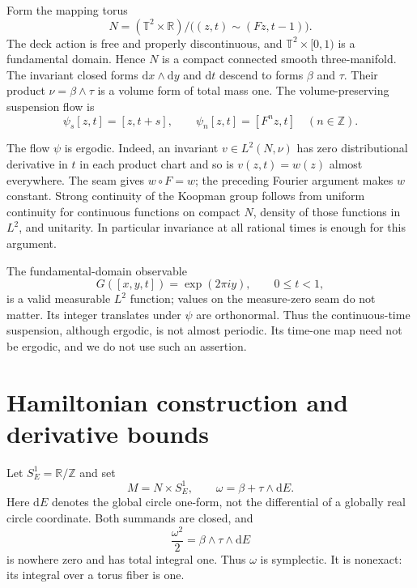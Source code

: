 \documentclass[11pt]{article}
\newcommand{\T}{\mathbb T}
\newcommand{\R}{\mathbb R}
\newcommand{\Z}{\mathbb Z}
\newcommand{\dd}{\mathrm d}
\begin{document}
Form the mapping torus
\[
 N=(\T^2\times\R)/\bigl((z,t)\sim(Fz,t-1)\bigr).
\]
The deck action is free and properly discontinuous, and
$\T^2\times[0,1)$ is a fundamental domain. Hence $N$ is a compact
connected smooth three-manifold. The invariant closed forms
$\dd x\wedge\dd y$ and $\dd t$ descend to forms $\beta$ and $\tau$.
Their product $\nu=\beta\wedge\tau$ is a volume form of total mass one.
The volume-preserving suspension flow is
\[
 \psi_s[z,t]=[z,t+s],\qquad \psi_n[z,t]=[F^n z,t]\quad(n\in\Z).
\]

The flow $\psi$ is ergodic. Indeed, an invariant $v\in L^2(N,\nu)$
has zero distributional derivative in $t$ in each product chart and so is
$v(z,t)=w(z)$ almost everywhere. The seam gives $w\circ F=w$;
the preceding Fourier argument makes $w$ constant. Strong continuity of
the Koopman group follows from uniform continuity for continuous functions
on compact $N$, density of those functions in $L^2$, and unitarity.
In particular invariance at all rational times is enough for this argument.

The fundamental-domain observable
\begin{equation}\label{eq:G}
 G([x,y,t])=\exp(2\pi i y),\qquad 0\le t<1,
\end{equation}
is a valid measurable $L^2$ function; values on the measure-zero seam
do not matter. Its integer translates under $\psi$ are orthonormal.
Thus the continuous-time suspension, although ergodic, is not almost periodic.
Its time-one map need not be ergodic, and we do not use such an assertion.

\section{Hamiltonian construction and derivative bounds}

Let $S^1_E=\R/\Z$ and set
\[
 M=N\times S^1_E,\qquad \omega=\beta+\tau\wedge\dd E.
\]
Here $\dd E$ denotes the global circle one-form, not the differential of
a globally real circle coordinate. Both summands are closed, and
\begin{equation}\label{eq:volume}
 \frac{\omega^2}{2}=\beta\wedge\tau\wedge\dd E
\end{equation}
is nowhere zero and has total integral one. Thus $\omega$ is symplectic.
It is nonexact: its integral over a torus fiber is one.
\end{document}
